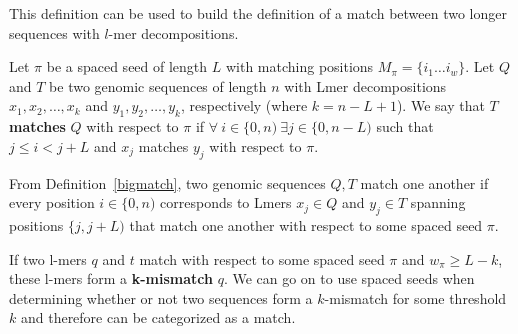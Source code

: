 This definition can be used to build the definition of a match between two longer sequences with $l$-mer decompositions.

\begin{defn}
Let $\pi$ be a spaced seed of length $L$ with matching positions $M_{\pi} = \lbrace i_{1} \dotsc i_{w} \rbrace$. Let $Q$ and $T$ be two genomic sequences of length $n$ with Lmer decompositions $x_{1},x_{2},\dotsc ,x_{k}$ and $y_{1},y_{2},\dotsc ,y_{k}$, respectively (where $k = n - L + 1$). We say that $T$ \textbf{matches} $Q$ with respect to $\pi$ if $\forall \  i \in \lbrace 0, n) \ \exists j \in \lbrace 0, n-L)$ such that $j \leq i < j+L$ and $x_{j}$ matches $y_{j}$ with respect to $\pi$.
\label{bigmatch}
\end{defn}

From Definition~\ref{bigmatch}, two genomic sequences $Q,T$ match one another if every position $i \in \lbrace 0,n)$ corresponds to Lmers $x_{j} \in Q$ and $y_{j} \in T$ spanning positions $\lbrace j,j+L)$ that match one another with respect to some spaced seed $\pi$.

If two l-mers $q$ and $t$ match with respect to some spaced seed $\pi$ and $w_{\pi} \geq L-k$, these l-mers form a \textbf{k-mismatch} $q$. We can go on to use spaced seeds when determining whether or not two sequences form a $k$-mismatch for some threshold $k$ and therefore can be categorized as a match.

